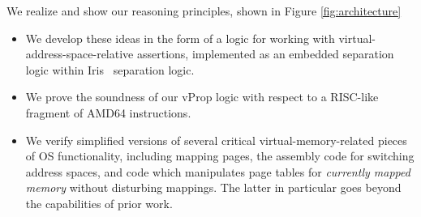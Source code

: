 We realize and show our reasoning principles, shown in Figure \ref{fig:architecture}
\begin{itemize}
\item We develop these ideas in the form of a logic for working with virtual-address-space-relative assertions,
      implemented as an embedded separation logic within Iris~\cite{jung2018iris} separation logic.
\item We prove the soundness of our \textsf{vProp} logic with respect to a RISC-like fragment of \textsf{AMD64} instructions.
\item We verify simplified versions of several critical virtual-memory-related pieces of OS functionality, 
      including mapping  pages, the assembly code for switching address spaces, and code which manipulates page
      tables for \emph{currently mapped memory} without disturbing mappings.
      The latter in particular goes beyond the capabilities of prior work.
\end{itemize}
